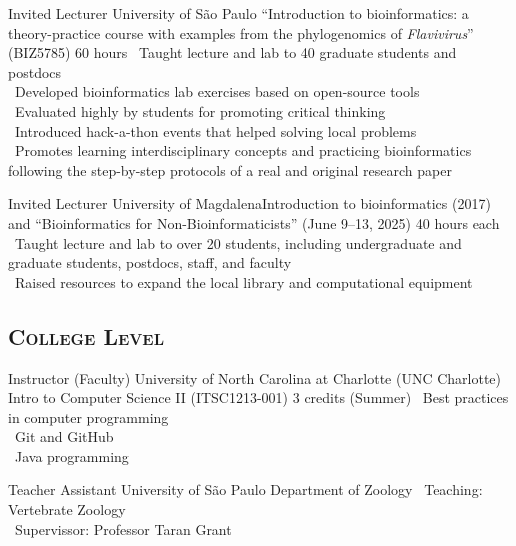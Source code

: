 \documentclass[11pt, letterpaper, sans]{moderncv}
\begin{document}
\vspace{.5em}

	{Invited Lecturer}
	{University of São Paulo}
	{``Introduction to bioinformatics: a theory-practice course with examples from the phylogenomics of \emph{Flavivirus}'' (BIZ5785)}
	{60 hours}
	{
		\textbullet~Taught lecture and lab to 40 graduate students and postdocs\\
		\textbullet~Developed bioinformatics lab exercises based on open-source tools\\
		\textbullet~Evaluated highly by students for promoting critical thinking\\
		\textbullet~Introduced hack-a-thon events that helped solving local problems\\
		\textbullet~Promotes learning interdisciplinary concepts and practicing bioinformatics following the step-by-step protocols of a real and original research paper
	}

\vspace{.5em}

	{Invited Lecturer}
	{University of Magdalena}{Introduction to bioinformatics (2017) and ``Bioinformatics for Non-Bioinformaticists'' (June 9--13, 2025)}
	{40 hours each}
	{
		\textbullet~Taught lecture and lab to over 20 students, including undergraduate and graduate students, postdocs, staff, and faculty\\
		\textbullet~Raised resources to expand the local library and computational equipment
	}

	\subsection{\textsc{College Level}}
\vspace{.5em}

	{Instructor (Faculty)}
	{University of North Carolina at Charlotte (UNC Charlotte)}
	{Intro to Computer Science II (ITSC1213-001)}
	{3 credits (Summer)}
	{
		\textbullet~Best practices in computer programming\\
        \textbullet~Git and GitHub\\
        \textbullet~Java programming\\
	}

	{Teacher Assistant}
	{University of São Paulo}
	{Department of Zoology}
	{}
	{
		\textbullet~Teaching: Vertebrate Zoology\\
		\textbullet~Supervissor: Professor Taran Grant
	}
\end{document}
